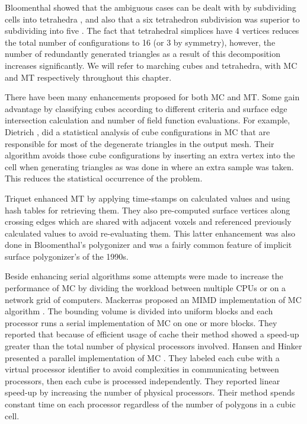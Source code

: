 Bloomenthal showed that the ambiguous cases can be dealt with by subdividing cells into tetrahedra \cite{Bloomenthal1994a}, and also 
that a six tetrahedron subdivision was superior to subdividing into five \cite{guziec1995exploiting}. 
The fact that tetrahedral simplices have 4 vertices reduces the total number of configurations to 16 (or 3 by symmetry), however, the number of 
redundantly generated triangles as a result of this decomposition increases significantly. 
We will refer to marching cubes and tetrahedra, with MC and MT respectively throughout this chapter.

There have been many enhancements proposed for both MC and MT. Some gain advantage by classifying cubes according to different criteria
and surface edge intersection calculation and number of field function evaluations. 
For example, Dietrich \etal \cite{Dietrich2009}, did a statistical analysis of cube configurations in MC that are responsible for most 
of the degenerate triangles in the output mesh. Their algorithm avoids those cube configurations by inserting an extra vertex into the 
cell when generating triangles as was done in \cite{Wyvill1986} where an extra sample was taken.
This reduces the statistical occurrence of the problem.

Triquet \etal \cite{Triquet2003} enhanced MT by applying time-stamps on calculated values and using hash tables for retrieving them. They
also pre-computed surface vertices along crossing edges which are shared with adjacent voxels and referenced previously calculated
values to avoid re-evaluating them. This latter enhancement was also done in Bloomenthal's polygonizer \cite{Bloomenthal1994a}
and was a fairly common feature of implicit surface polygonizer's of the 1990s.

Beside enhancing serial algorithms some attempts were made to increase the performance of MC by dividing the workload between
multiple CPUs or on a network grid of computers. Mackerras proposed an MIMD implementation of MC algorithm \cite{mackerras1992fast}. 
The bounding volume is divided into uniform blocks and each processor runs a serial implementation of MC on one or more blocks. They 
reported that because of efficient usage of cache their method showed a speed-up greater than the total number of physical
processors involved. Hansen and Hinker presented a parallel implementation of MC \cite{hansen1992massively}. They labeled each cube
with a virtual processor identifier to avoid complexities in communicating between processors, then each cube is processed
independently. They reported linear speed-up by increasing the number of physical processors. Their method spends constant time on
each processor regardless of the number of polygons in a cubic cell.

